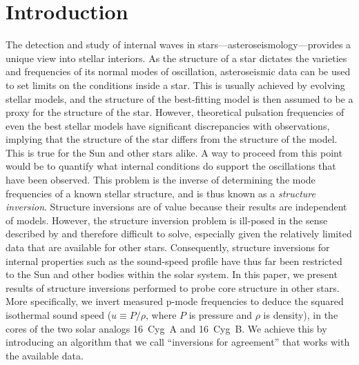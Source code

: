 \section{Introduction} 

The detection and study of internal waves in stars---asteroseismology---provides a unique view into stellar interiors. 
As the structure of a star dictates the varieties and frequencies of its normal modes of oscillation, asteroseismic data can be used to set limits on the conditions inside a star. 
This is usually achieved by evolving stellar models, and the structure of the best-fitting model is then assumed to be a proxy for the structure of the star. 
However, theoretical pulsation frequencies of even the best stellar models have significant discrepancies with observations, implying that the structure of the star differs from the structure of the model. 
This is true for the Sun and other stars alike. 
A way to proceed from this point would be to quantify what internal conditions do support the oscillations that have been observed. 
This problem is the inverse of determining the mode frequencies of a known stellar structure, and is thus known as a \emph{structure inversion}. 
Structure inversions are of value because their results are independent of models. 
However, the structure inversion problem is ill-posed in the sense described by \citet{hadamard} and therefore difficult to solve, especially given the relatively limited data that are available for other stars. 
Consequently, structure inversions for internal properties such as the sound-speed profile have thus far been restricted to the Sun and other bodies within the solar system. 
In this paper, we present results of structure inversions performed to probe core structure in other stars. 
More specifically, we invert measured p-mode frequencies to deduce the squared isothermal sound speed (${u\equiv P/\rho}$, where $P$ is pressure and $\rho$ is density), in the cores of the two solar analogs 16~Cyg~A and 16~Cyg~B. 
We achieve this by introducing an algorithm that we call ``inversions for agreement'' that works with the available data. 


